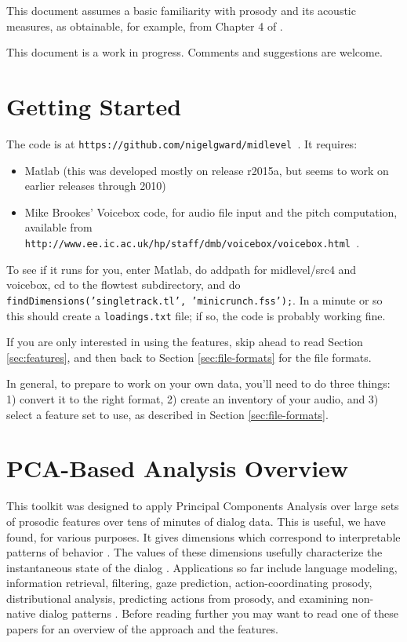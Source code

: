 \documentclass[11pt]{article}
\begin{document}
This document assumes a basic familiarity with prosody and its
acoustic measures, as obtainable, for example, from Chapter 4 of
\cite{ladefoged03}.

This document is a work in progress.  Comments and suggestions are
welcome.


\section{Getting Started}

The code is at {\tt https://github.com/nigelgward/midlevel }.  It requires:
\begin{itemize}\setlength{\itemsep}{0pt}\setlength{\parskip}{0pt}
\item Matlab (this was developed mostly on release r2015a, but seems
  to work on earlier releases through 2010)
\item Mike Brookes' Voicebox code, for audio file input and the pitch
  computation, available from {\tt
    http://www.ee.ic.ac.uk/hp/staff/dmb/voicebox/voicebox.html }.
\end{itemize}

To see if it runs for you, enter Matlab, do addpath for midlevel/src4
and voicebox, cd to the flowtest subdirectory, and do {\tt
  findDimensions('singletrack.tl', 'minicrunch.fss');}. In a minute or
so this should create a {\tt loadings.txt} file; if so, the code is
probably working fine. 

If you are only interested in using the features, skip ahead to read
Section \ref{sec:features}, and then back to Section
\ref{sec:file-formats} for the file formats.

In general, to prepare to work on your own data, you'll need to do
three things: 1) convert it to the right format, 2) create an
inventory of your audio, and 3) select a feature set to use, as
described in Section \ref{sec:file-formats}.


\section{PCA-Based Analysis Overview }

This toolkit was designed to apply Principal Components Analysis over
large sets of prosodic features over tens of minutes of dialog data.
This is useful, we have found, for various purposes.  It gives
dimensions which correspond to interpretable patterns of behavior
\cite{prosodic-elements}.  The values of these dimensions usefully
characterize the instantaneous state of the dialog
\cite{dialog-dimensions}.  Applications so far include language
modeling, information retrieval, filtering, gaze prediction,
action-coordinating prosody, distributional analysis, predicting
actions from prosody, and examining non-native dialog patterns
\cite{pca-lm,prosody-ir,sigdial-codec,ward-gaze,ward-abu,lala15,dimensions-uh-huh,l2english}.
Before reading further you may want to read one of these papers for an
overview of the approach and the features.
\end{document}
